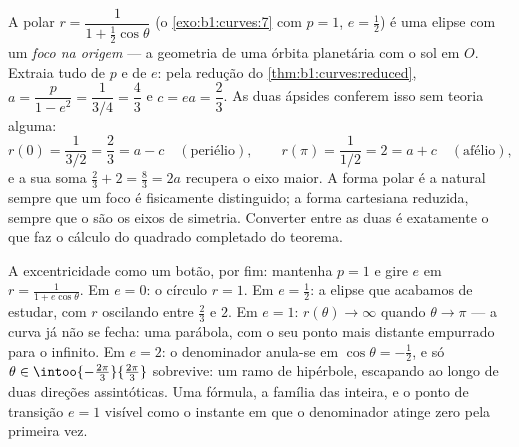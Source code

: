 \begin{example}
\label{ex:b1:curves:orbit}
A  polar $r = \dfrac{1}{1 + \frac12\cos\theta}$ (o \cref{exo:b1:curves:7} com $p = 1$, $e = \frac12$) é uma elipse com um
\emph{foco na origem} --- a geometria de uma órbita planetária com o
sol em $O$. Extraia tudo de $p$ e de $e$: pela redução do \cref{thm:b1:curves:reduced},
$a = \dfrac{p}{1 - e^2} =
\dfrac{1}{3/4} = \dfrac43$ e $c = ea = \dfrac23$. As duas ápsides conferem isso sem teoria alguma:
\[
r(0) = \frac{1}{3/2} = \frac23 = a - c
\quad (\text{periélio}),
\qquad
r(\pi) = \frac{1}{1/2} = 2 = a + c
\quad (\text{afélio}),
\]
e a sua soma $\frac23 + 2 = \frac83 = 2a$ recupera o eixo maior. A forma polar é a natural
sempre que um foco é fisicamente distinguido; a forma cartesiana
reduzida, sempre que o são os eixos de simetria. Converter entre as
duas é exatamente o que faz o cálculo do quadrado completado do
teorema.

A excentricidade como um botão, por fim: mantenha $p = 1$ e gire $e$
em $r
= \frac{1}{1 + e\cos\theta}$. Em $e = 0$: o círculo $r = 1$. Em $e = \frac12$: a elipse que
acabamos de estudar, com $r$ oscilando entre $\frac23$ e $2$. Em
$e = 1$: $r(\theta) \to \infty$ quando $\theta
\to \pi$ --- a curva já não se fecha: uma
parábola, com o seu ponto mais distante empurrado para o infinito. Em
$e = 2$: o denominador anula-se em $\cos\theta = -\frac12$, e só $\theta \in
\intoo{-\frac{2\pi}3}{\frac{2\pi}3}$ sobrevive: um
ramo de hipérbole, escapando ao longo de duas direções assintóticas.
Uma fórmula, a família das  inteira, e o ponto de transição
$e = 1$ visível como o instante em que o denominador atinge zero pela
primeira vez.
\end{example}

